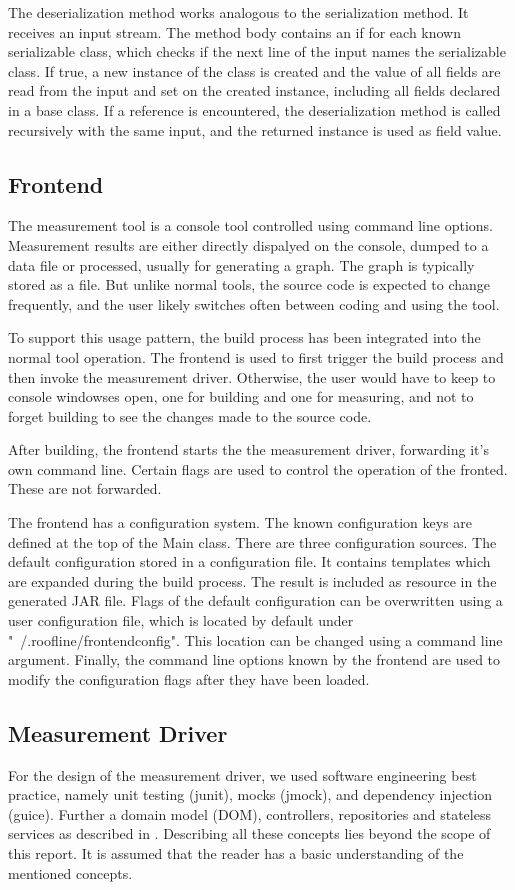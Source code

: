 \documentclass[a4paper,12pt]{article}
\begin{document}
The deserialization method works analogous to the serialization method. It
receives an input stream. The method body contains an if for each known
serializable class, which checks if the next line of the input names  the
serializable class. If true, a new instance of the class is created and the
value of all fields are read from the input and set on the created instance,
including all fields declared in a base class. If a reference is encountered,
the deserialization method is called recursively with the same input, and the
returned instance is used as field value.

\subsection{Frontend}
The measurement tool is a console tool controlled using command line options.
Measurement results are either directly dispalyed on the console, dumped to a
data file or processed, usually for generating a graph. The graph is typically
stored as a file. But unlike normal tools, the source code is expected to change
frequently, and the user likely switches often between coding and using the
tool.

To support this usage pattern, the build process has been integrated into the
normal tool operation. The frontend is used to first trigger the build process
and then invoke the measurement driver. Otherwise, the user would have to keep
to console windowses open, one for building and one for measuring, and not to
forget building to see the changes made to the source code.

After building, the frontend starts the the measurement driver, forwarding it's
own command line. Certain flags are used to control the operation of the
fronted. These are not forwarded.

The frontend has a configuration system. The known configuration keys are
defined at the top of the Main class. There are three configuration sources. The
default configuration stored in a configuration file. It contains templates
which are expanded during the build process. The result is included as resource
in the generated JAR file. Flags of the default configuration can be overwritten
using a user configuration file, which is located by default under
"~/.roofline/frontendconfig". This location can be changed using a command line
argument. Finally, the command line options known by the frontend are used to
modify the configuration flags after they have been loaded. 

\subsection{Measurement Driver}
For the design of the measurement driver, we used software engineering best
practice, namely unit testing (junit), mocks (jmock), and dependency
injection (guice). Further a domain model (DOM), controllers, repositories and
stateless services as described in \cite{evans2004domain}.
Describing all these concepts lies beyond the scope of this report. It is
assumed that the reader has a basic understanding of the mentioned concepts.
\end{document}
